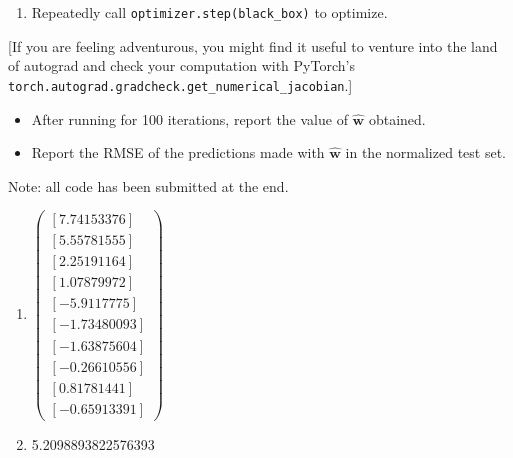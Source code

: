 \documentclass[submit]{harvardml}
\begin{document}
\begin{problem}[14pts]
\begin{enumerate}
\begin{verbatim}
    ...

    # Set the gradient of the variable.
    weights.grad = Tensor({numpy})

    return {objective}
\end{verbatim}

\item Repeatedly call \texttt{optimizer.step(black\_box)} to optimize.

\end{enumerate}

[If you are feeling adventurous, you might find it useful to venture
into the land of autograd and check your computation with PyTorch's
\texttt{torch.autograd.gradcheck.get\_numerical\_jacobian}.]

\begin{itemize}
\item After running for 100 iterations, report the value of $\hat{\mathbf{w}}$ obtained.
\item Report the RMSE of the predictions made with $\hat{\mathbf{w}}$ in the normalized test set.
\end{itemize}
\vspace{0.1cm}

\end{problem}
Note: all code has been submitted at the end.
\begin{enumerate}[label=(\alph*)]
	\item 		$\begin{pmatrix}
				[ 7.74153376]\\ 
                [ 5.55781555]\\
                [ 2.25191164]\\
                [ 1.07879972]\\
                [-5.9117775 ]\\
                [-1.73480093]\\
                [-1.63875604]\\
                [-0.26610556]\\
                [ 0.81781441]\\
                [-0.65913391]\end{pmatrix}$
    \item	5.2098893822576393
\end{enumerate}
\end{document}
